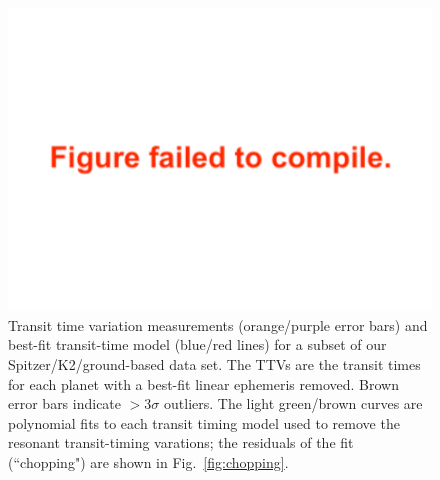 \documentclass[twocolumn]{aastex63}
\begin{document}
\begin{figure}
    \includegraphics[width=0.95\hsize]{figures/T1_ttvs_4panel_stacked.pdf}
    {Transit time variation measurements (orange/purple error bars) and best-fit
        transit-time model (blue/red lines) for a subset of our
        Spitzer/K2/ground-based data set.  The TTVs are the transit times for each planet
        with a best-fit linear ephemeris removed.  Brown error bars indicate $>3\sigma$ outliers.  The light green/brown curves are polynomial fits
        to each transit timing model used to remove the resonant transit-timing varations;  the residuals
        of the fit (``chopping") are shown in Fig.\ \ref{fig:chopping}.}
    \label{fig:T1_TTVs}
\end{figure}
\end{document}

